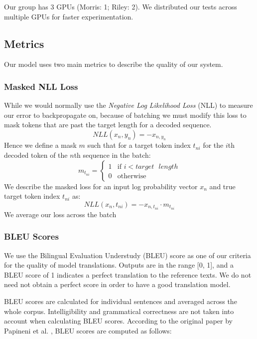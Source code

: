 \documentclass[twoside,twocolumn]{article}
\begin{document}
Our group has 3 GPUs (Morris: 1; Riley: 2). We distributed our tests across
multiple GPUs for faster experimentation.
\subsection{Metrics}
Our model uses two main metrics to describe the quality of our system.
\subsubsection{Masked NLL Loss}
\label{sec:masked-loss}
While we would normally use the \emph{Negative Log Likelihood Loss} (NLL) to
measure our error to backpropagate on, because of batching we must modify this
loss to mask tokens that are past the target length for a decoded sequence.
\begin{equation}
  NLL(x_n, y_n) = -x_{n, y_n}
\end{equation}
Hence we define a mask $m$ such that for a target token index $t_{ni}$ for the
$i$th decoded token of the $n$th sequence in the batch:
\begin{equation}
  m_{t_{ni}} = \begin{cases}
    1 & \text{if } i < target \text{ } length \\
    0 & \text{otherwise}
  \end{cases}
\end{equation}
We describe the masked loss for an input log probability vector $x_n$ and true
target token index $t_{ni}$ as:
\begin{equation}
  NLL(x_n, t_{ni}) = -x_{n, t_{ni}} \cdot m_{t_{ni}}
\end{equation}
We average our loss across the batch
\subsubsection{BLEU Scores}
\label{sec:bleu}
We use the Bilingual Evaluation Understudy (BLEU) score as one of our criteria
for the quality of model translations. Outputs are in the range [0, 1], and a
BLEU score of 1 indicates a perfect translation to the reference texts.
We do not need not obtain a perfect score in order to have a good
translation model.

BLEU scores are calculated for individual sentences and averaged across the
whole corpus. Intelligibility and grammatical correctness are not taken into
account when calculating BLEU scores. According to the original paper by
Papineni et al. \cite{papineni2002bleu}, BLEU scores are computed as follows:
\end{document}

